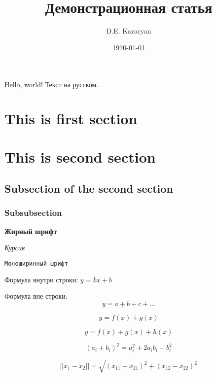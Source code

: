 \documentclass[a4paper,12pt]{article}
\title{Демонстрационная статья}
\date{\today}
\author{D.E. Kazaryan}
\begin{document}
\maketitle


Hello, world! Текст на русском.

\section{This is first section}

\section{This is second section}

\subsection{Subsection of the second section}

\subsubsection{Subsubsection}

\textbf{Жирный шрифт}

\textit{Курсив}

\texttt{Моноширинный шрифт}

Формула внутри строки: $y=kx+b$

Формула вне строки: $$y=a+b+c+...$$

\begin{equation}
    y = f(x) + g(x)
\end{equation}

\begin{equation*}
    y = f(x) + g(x) + h(x)
\end{equation*}

\begin{equation}
    (a_i+b_i)^2 = a_i^2 + 2 a_i b_i + b_i^2
\end{equation}

\begin{equation}
    ||x_1 - x_2|| = \sqrt{(x_{11} - x_{21})^2 + (x_{12} - x_{22})^2}
\end{equation}
\end{document}
